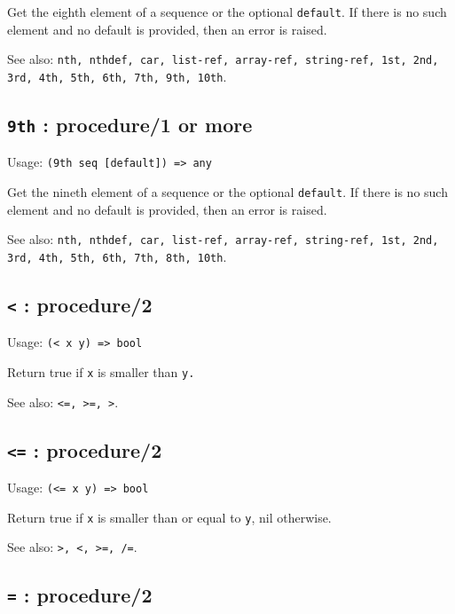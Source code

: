 \documentclass[
]{article}
\newcommand{\passthrough}[1]{#1}
\begin{document}
Get the eighth element of a sequence or the optional
\passthrough{\lstinline!default!}. If there is no such element and no
default is provided, then an error is raised.

See also:
\passthrough{\lstinline!nth, nthdef, car, list-ref, array-ref, string-ref, 1st, 2nd, 3rd, 4th, 5th, 6th, 7th, 9th, 10th!}.

\hypertarget{th-procedure1-or-more-13}{%
\subsection{\texorpdfstring{\texttt{9th} : procedure/1 or
more}{9th : procedure/1 or more}}\label{th-procedure1-or-more-13}}

Usage: \passthrough{\lstinline!(9th seq [default]) => any!}

Get the nineth element of a sequence or the optional
\passthrough{\lstinline!default!}. If there is no such element and no
default is provided, then an error is raised.

See also:
\passthrough{\lstinline!nth, nthdef, car, list-ref, array-ref, string-ref, 1st, 2nd, 3rd, 4th, 5th, 6th, 7th, 8th, 10th!}.

\hypertarget{procedure2-9}{%
\subsection{\texorpdfstring{\texttt{\textless{}} :
procedure/2}{\textless{} : procedure/2}}\label{procedure2-9}}

Usage: \passthrough{\lstinline!(< x y) => bool!}

Return true if \passthrough{\lstinline!x!} is smaller than
\passthrough{\lstinline!y.!}

See also: \passthrough{\lstinline!<=, >=, >!}.

\hypertarget{procedure2-10}{%
\subsection{\texorpdfstring{\texttt{\textless{}=} :
procedure/2}{\textless= : procedure/2}}\label{procedure2-10}}

Usage: \passthrough{\lstinline!(<= x y) => bool!}

Return true if \passthrough{\lstinline!x!} is smaller than or equal to
\passthrough{\lstinline!y!}, nil otherwise.

See also: \passthrough{\lstinline!>, <, >=, /=!}.

\hypertarget{procedure2-11}{%
\subsection{\texorpdfstring{\texttt{=} :
procedure/2}{= : procedure/2}}\label{procedure2-11}}
\end{document}

